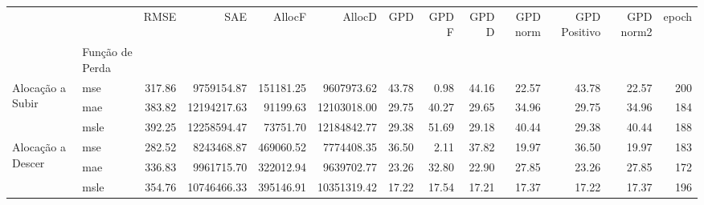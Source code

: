 \begin{tabular}{llrrrrrrrrrrr}
\toprule
 &  & RMSE & SAE & AllocF & AllocD & GPD & GPD F & GPD D & GPD norm & GPD Positivo & GPD norm2 & epoch \\
 & Função de Perda &  &  &  &  &  &  &  &  &  &  &  \\
\midrule
\multirow[t]{3}{*}{Alocação a Subir} & mse & 317.86 & 9759154.87 & 151181.25 & 9607973.62 & 43.78 & 0.98 & 44.16 & 22.57 & 43.78 & 22.57 & 200 \\
 & mae & 383.82 & 12194217.63 & 91199.63 & 12103018.00 & 29.75 & 40.27 & 29.65 & 34.96 & 29.75 & 34.96 & 184 \\
 & msle & 392.25 & 12258594.47 & 73751.70 & 12184842.77 & 29.38 & 51.69 & 29.18 & 40.44 & 29.38 & 40.44 & 188 \\
\cline{1-13}
\multirow[t]{3}{*}{Alocação a Descer} & mse & 282.52 & 8243468.87 & 469060.52 & 7774408.35 & 36.50 & 2.11 & 37.82 & 19.97 & 36.50 & 19.97 & 183 \\
 & mae & 336.83 & 9961715.70 & 322012.94 & 9639702.77 & 23.26 & 32.80 & 22.90 & 27.85 & 23.26 & 27.85 & 172 \\
 & msle & 354.76 & 10746466.33 & 395146.91 & 10351319.42 & 17.22 & 17.54 & 17.21 & 17.37 & 17.22 & 17.37 & 196 \\
\cline{1-13}
\bottomrule
\end{tabular}

